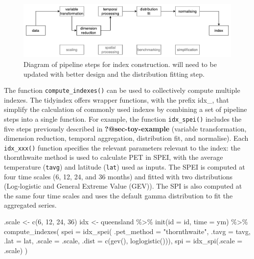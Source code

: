 \documentclass[
]{interact}
\newenvironment{Shaded}{\begin{snugshade}}{\end{snugshade}}
\newcommand{\AttributeTok}[1]{\textcolor[rgb]{0.40,0.45,0.13}{#1}}
\newcommand{\DecValTok}[1]{\textcolor[rgb]{0.68,0.00,0.00}{#1}}
\newcommand{\FunctionTok}[1]{\textcolor[rgb]{0.28,0.35,0.67}{#1}}
\newcommand{\NormalTok}[1]{\textcolor[rgb]{0.00,0.23,0.31}{#1}}
\newcommand{\OtherTok}[1]{\textcolor[rgb]{0.00,0.23,0.31}{#1}}
\newcommand{\SpecialCharTok}[1]{\textcolor[rgb]{0.37,0.37,0.37}{#1}}
\newcommand{\StringTok}[1]{\textcolor[rgb]{0.13,0.47,0.30}{#1}}
\begin{document}
\begin{figure}

{\centering \includegraphics[width=1\textwidth,height=0.9\textheight]{figures/pipeline-spei.png}

}

\caption{\label{fig-pipeline-spei}Diagram of pipeline steps for index
construction. will need to be updated with better design and the
distribution fitting step.}

\end{figure}

The function \texttt{compute\_indexes()} can be used to collectively
compute multiple indexes. The tidyindex offers wrapper functions, with
the prefix idx\_, that simplify the calculation of commonly used indexes
by combining a set of pipeline steps into a single function. For
example, the function \texttt{idx\_spei()} includes the five steps
previously described in \textbf{?@sec-toy-example} (variable
transformation, dimension reduction, temporal aggregation, distribution
fit, and normalise). Each \texttt{idx\_xxx()} function specifies the
relevant parameters relevant to the index: the thornthwaite method is
used to calculate PET in SPEI, with the average temperature
(\texttt{tavg}) and latitude (\texttt{lat}) used as inputs. The SPEI is
computed at four time scales (6, 12, 24, and 36 months) and fitted with
two distributions (Log-logistic and General Extreme Value (GEV)). The
SPI is also computed at the same four time scales and uses the default
gamma distribution to fit the aggregated series.

\begin{Shaded}
\begin{Highlighting}[]
\NormalTok{.scale }\OtherTok{\textless{}{-}} \FunctionTok{c}\NormalTok{(}\DecValTok{6}\NormalTok{, }\DecValTok{12}\NormalTok{, }\DecValTok{24}\NormalTok{, }\DecValTok{36}\NormalTok{)}
\NormalTok{idx }\OtherTok{\textless{}{-}}\NormalTok{ queensland }\SpecialCharTok{\%\textgreater{}\%}
  \FunctionTok{init}\NormalTok{(}\AttributeTok{id =}\NormalTok{ id, }\AttributeTok{time =}\NormalTok{ ym) }\SpecialCharTok{\%\textgreater{}\%}
  \FunctionTok{compute\_indexes}\NormalTok{(}
    \AttributeTok{spei =} \FunctionTok{idx\_spei}\NormalTok{(}
      \AttributeTok{.pet\_method =} \StringTok{"thornthwaite"}\NormalTok{, }\AttributeTok{.tavg =}\NormalTok{ tavg, }\AttributeTok{.lat =}\NormalTok{ lat, }
      \AttributeTok{.scale =}\NormalTok{ .scale, }\AttributeTok{.dist =} \FunctionTok{c}\NormalTok{(}\FunctionTok{gev}\NormalTok{(), }\FunctionTok{loglogistic}\NormalTok{())),}
    \AttributeTok{spi =} \FunctionTok{idx\_spi}\NormalTok{(}\AttributeTok{.scale =}\NormalTok{ .scale)}
\NormalTok{  )}
\end{Highlighting}
\end{Shaded}
\end{document}
